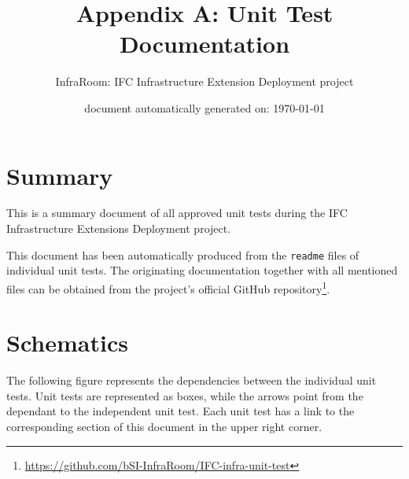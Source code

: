 \documentclass{scrartcl}
\title{Appendix A: Unit Test Documentation}
\author{InfraRoom: IFC Infrastructure Extension Deployment project}
\date{document automatically generated on: \today}
\begin{document}
\maketitle

\section{Summary}
\label{sec:summary}

This is a summary document of all approved unit tests during the IFC Infrastructure Extensions Deployment project.

This document has been automatically produced from the \texttt{readme} files of individual unit tests.
The originating documentation together with all mentioned files can be obtained
 from the project's official GitHub repository\footnote{\url{https://github.com/bSI-InfraRoom/IFC-infra-unit-test}}.

\section{Schematics}
\label{sec:schematics}

The following figure represents the dependencies between the individual unit tests.
Unit tests are represented as boxes, while the arrows point from the dependant to the independent unit test.
Each unit test has a link to the corresponding section of this document in the upper right corner.
\end{document}
